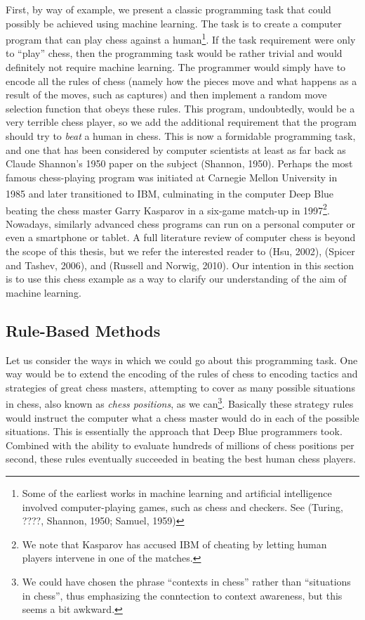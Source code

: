 First, by way of example, we present a classic programming task that could possibly be achieved using machine learning. The task is to create a computer program that can play chess against a human\footnote{Some of the earliest works in machine learning and artificial intelligence involved computer-playing games, such as chess and checkers. See (Turing, ????, Shannon, 1950; Samuel, 1959)}. If the task requirement were only to ``play'' chess, then the programming task would be rather trivial and would definitely not require machine learning. The programmer would simply have to encode all the rules of chess (namely how the pieces move and what happens as a result of the moves, such as captures) and then implement a random move selection function that obeys these rules. This program, undoubtedly, would be a very terrible chess player, so we add the additional requirement that the program should try to \emph{beat} a human in chess. This is now a formidable programming task, and one that has been considered by computer scientists at least as far back as Claude Shannon's 1950 paper on the subject (Shannon, 1950). Perhaps the most famous chess-playing program was initiated at Carnegie Mellon University in 1985 and later transitioned to IBM, culminating in the computer Deep Blue\textsuperscript{\textregistered} beating the chess master Garry Kasparov in a six-game match-up in 1997\footnote{We note that Kasparov has accused IBM of cheating by letting human players intervene in one of the matches.}. Nowadays, similarly advanced chess programs can run on a personal computer or even a smartphone or tablet. A full literature review of computer chess is beyond the scope of this thesis, but we refer the interested reader to (Hsu, 2002), (Spicer and Tashev, 2006), and (Russell and Norwig, 2010). Our intention in this section is to use this chess example as a way to clarify our understanding of the aim of machine learning.

\subsection{Rule-Based Methods}
\label{sec:rule-based}

Let us consider the ways in which we could go about this programming task. One way would be to extend the encoding of the rules of chess to encoding tactics and strategies of great chess masters, attempting to cover as many possible situations in chess, also known as \emph{chess positions}, as we can\footnote{We could have chosen the phrase ``contexts in chess'' rather than ``situations in chess'', thus emphasizing the conntection to context awareness, but this seems a bit awkward.}. Basically these strategy rules would instruct the computer what a chess master would do in each of the possible situations. This is essentially the approach that Deep Blue programmers took. Combined with the ability to evaluate hundreds of millions of chess positions per second, these rules eventually succeeded in beating the best human chess players.


